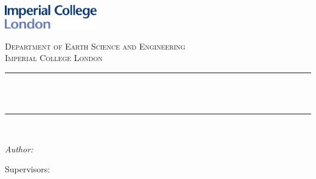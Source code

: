 \begin{titlepage}

\newcommand{\HRule}{\rule{\linewidth}{0.5mm}} %



\includegraphics[width = 4cm]{./figures/imperial}\\[0.5cm] 

\begin{center} %

\textsc{\large Department of Earth Science and Engineering}\\[0.5cm] 
\textsc{\Large Imperial College London}\\[0.5cm] 

\vspace{1.9cm}
\HRule \\[0.4cm]
{ \fontsize{20}{21} \bfseries \reporttitle}\\ %
\HRule \\[2.5cm]
\end{center}

\begin{flushleft} \large
\textit{Author:}\\
\reportauthor %
\end{flushleft}
\vspace{1.5cm}
\makeatletter

\noindent Supervisors: 
\vspace{0.2cm}


\end{titlepage}
